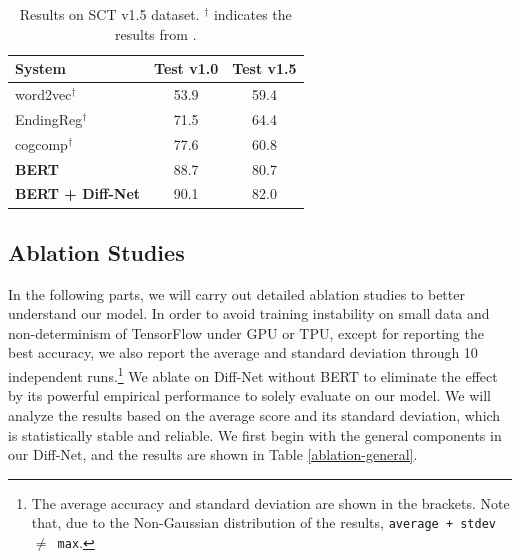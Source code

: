 \documentclass[letterpaper]{article} %
\begin{document}
\begin{table}[t]
\small
\begin{center}
\begin{tabular}{p{3.5cm} cc}
\toprule
{\bf System} 					& {\bf Test v1.0} & {\bf Test v1.5} \\
\midrule
word2vec$^\dag$					& 53.9 & 59.4 \\
EndingReg$^\dag$					& 71.5 & 64.4 \\
cogcomp$^\dag$					& 77.6 & 60.8 \\
\midrule
\bf BERT 						& 88.7 & 80.7 \\
\bf BERT + Diff-Net 			& 90.1 & 82.0 \\
\bottomrule
\end{tabular}
\end{center}
\caption{\label{sct15-results} Results on SCT v1.5 dataset. $^\dag$ indicates the results from \citeauthor{sharma-etal-2018-tackling} .   }
\end{table} 


        
\subsection{Ablation Studies}
In the following parts, we will carry out detailed ablation studies to better understand our model.
In order to avoid training instability on small data and non-determinism of TensorFlow under GPU or TPU, except for reporting the best accuracy, we also report the average and standard deviation through 10 independent runs.\footnote{The average accuracy and standard deviation are shown in the brackets. Note that, due to the Non-Gaussian distribution of the results, {\tt average + stdev $\ne$ max}.}
We ablate on Diff-Net without BERT to eliminate the effect by its powerful empirical performance to solely evaluate on our model.
We will analyze the results based on the average score and its standard deviation, which is statistically stable and reliable.
We first begin with the general components in our Diff-Net, and the results are shown in Table \ref{ablation-general}.
\end{document}
